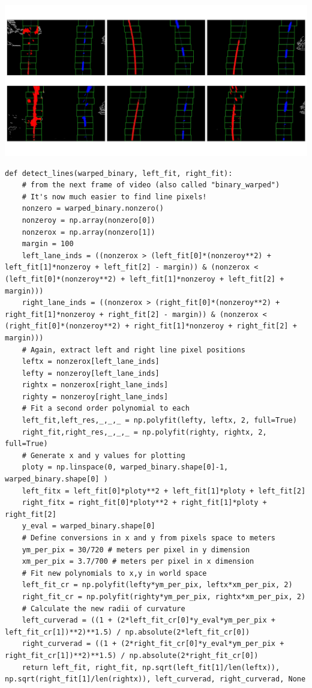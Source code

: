 \documentclass[11pt]{article}
\begin{document}
\includegraphics[width=.9\linewidth]{output_images/detected_lines_test_images.jpg}

\begin{verbatim}
def detect_lines(warped_binary, left_fit, right_fit):
    # from the next frame of video (also called "binary_warped")
    # It's now much easier to find line pixels!
    nonzero = warped_binary.nonzero()
    nonzeroy = np.array(nonzero[0])
    nonzerox = np.array(nonzero[1])
    margin = 100
    left_lane_inds = ((nonzerox > (left_fit[0]*(nonzeroy**2) + left_fit[1]*nonzeroy + left_fit[2] - margin)) & (nonzerox < (left_fit[0]*(nonzeroy**2) + left_fit[1]*nonzeroy + left_fit[2] + margin))) 
    right_lane_inds = ((nonzerox > (right_fit[0]*(nonzeroy**2) + right_fit[1]*nonzeroy + right_fit[2] - margin)) & (nonzerox < (right_fit[0]*(nonzeroy**2) + right_fit[1]*nonzeroy + right_fit[2] + margin)))  
    # Again, extract left and right line pixel positions
    leftx = nonzerox[left_lane_inds]
    lefty = nonzeroy[left_lane_inds] 
    rightx = nonzerox[right_lane_inds]
    righty = nonzeroy[right_lane_inds]
    # Fit a second order polynomial to each
    left_fit,left_res,_,_,_ = np.polyfit(lefty, leftx, 2, full=True)
    right_fit,right_res,_,_,_ = np.polyfit(righty, rightx, 2, full=True)
    # Generate x and y values for plotting
    ploty = np.linspace(0, warped_binary.shape[0]-1, warped_binary.shape[0] )
    left_fitx = left_fit[0]*ploty**2 + left_fit[1]*ploty + left_fit[2]
    right_fitx = right_fit[0]*ploty**2 + right_fit[1]*ploty + right_fit[2]
    y_eval = warped_binary.shape[0]
    # Define conversions in x and y from pixels space to meters
    ym_per_pix = 30/720 # meters per pixel in y dimension
    xm_per_pix = 3.7/700 # meters per pixel in x dimension
    # Fit new polynomials to x,y in world space
    left_fit_cr = np.polyfit(lefty*ym_per_pix, leftx*xm_per_pix, 2)
    right_fit_cr = np.polyfit(righty*ym_per_pix, rightx*xm_per_pix, 2)
    # Calculate the new radii of curvature
    left_curverad = ((1 + (2*left_fit_cr[0]*y_eval*ym_per_pix + left_fit_cr[1])**2)**1.5) / np.absolute(2*left_fit_cr[0])
    right_curverad = ((1 + (2*right_fit_cr[0]*y_eval*ym_per_pix + right_fit_cr[1])**2)**1.5) / np.absolute(2*right_fit_cr[0])
    return left_fit, right_fit, np.sqrt(left_fit[1]/len(leftx)), np.sqrt(right_fit[1]/len(rightx)), left_curverad, right_curverad, None
\end{verbatim}
\end{document}
